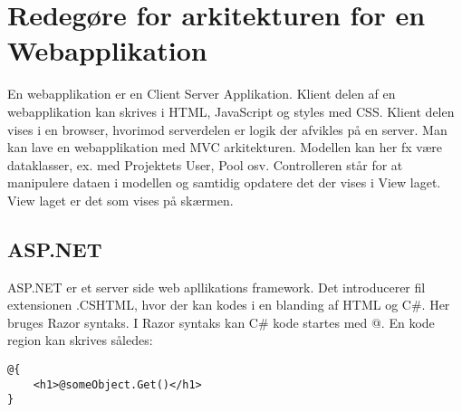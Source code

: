 \section{Redegøre for arkitekturen for en Webapplikation}\label{sec:spm9}

En webapplikation er en Client Server Applikation. Klient delen af en webapplikation kan skrives i HTML, JavaScript og styles med CSS. Klient delen vises i en browser, hvorimod serverdelen er logik der afvikles på en server. Man kan lave en webapplikation med MVC arkitekturen. Modellen kan her fx være dataklasser, ex. med Projektets User, Pool osv. Controlleren står for at manipulere dataen i modellen og samtidig opdatere det der vises i View laget. View laget er det som vises på skærmen.


\subsection{ASP.NET}
ASP.NET er et server side web apllikations framework. Det introducerer fil extensionen .CSHTML, hvor der kan kodes i en blanding af HTML og C\#. Her bruges Razor syntaks. I Razor syntaks kan C\# kode startes med @. En kode region kan skrives således:

\begin{lstlisting}
@{
	<h1>@someObject.Get()</h1>
}
\end{lstlisting}


